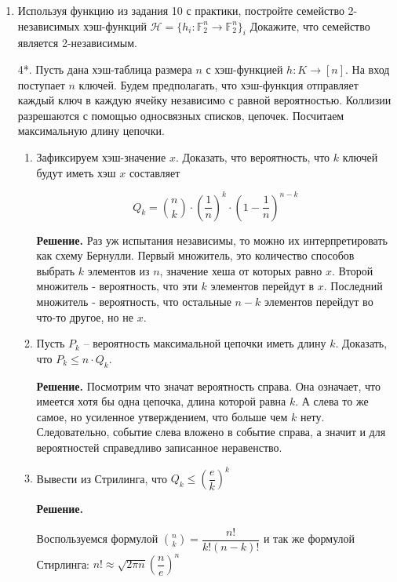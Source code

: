 \begin{enumerate}
	\item Используя функцию из задания 10 с практики, постройте семейство 2-независимых хэш-функций $\mathcal{H} 
	= \{h_i: \mathbb{F}^n_2 \rightarrow \mathbb{F}^n_2\}_i$ Докажите, что семейство является 2-независимым.
		
	\item[4*.] Пусть дана хэш-таблица размера $n$ с хэш-функцией $h : K \rightarrow [n]$. На вход поступает $n$ 
	ключей. Будем предполагать, что хэш-функция отправляет каждый ключ в каждую ячейку независимо с равной 
	вероятностью. Коллизии разрешаются с помощью односвязных списков, цепочек. Посчитаем максимальную длину 
	цепочки.
	
	\begin{enumerate}
		\item Зафиксируем хэш-значение $x$. Доказать, что вероятность, что $k$ ключей будут иметь хэш $x$ 
		составляет
		
		\begin{equation*}
			Q_k = \binom{n}{k}\cdot \left( \frac{1}{n} \right)^k \cdot \left(1 - \frac{1}{n} \right)^{n-k}
		\end{equation*}
		
		\textbf{Решение.} Раз уж испытания независимы, то можно их интерпретировать как схему Бернулли. Первый 
		множитель, это количество способов выбрать $k$ элементов из $n$, значение хеша от которых равно $x$. 
		Второй множитель - вероятность, что эти $k$ элементов перейдут в $x$. Последний множитель - вероятность, 
		что остальные $n - k$ элементов перейдут во что-то другое, но не $x$.
		
		\item Пусть $P_k$ – вероятность максимальной цепочки иметь длину $k$. Доказать, что $P_k \leqslant n 
		\cdot Q_k$.
		
		\textbf{Решение.} Посмотрим что значат вероятность справа. Она означает, что имеется хотя бы одна 
		цепочка, длина которой равна $k$. А слева то же самое, но усиленное утверждением, что больше чем $k$ 
		нету. Следовательно, событие слева вложено в событие справа, а значит и для вероятностей справедливо 
		записанное неравенство.
		
		\item Вывести из Стрилинга, что $Q_k \le \left(\dfrac{e}{k}\right)^k$
		
		\textbf{Решение.} 
		
		Воспользуемся формулой $\binom{n}{k} = \dfrac{n!}{k!(n-k)!}$ и так же формулой Стирлинга: $n! \approx \sqrt{2\pi n}\left(\dfrac{n}{e}\right)^n$
		

\end{enumerate}
\end{enumerate}

